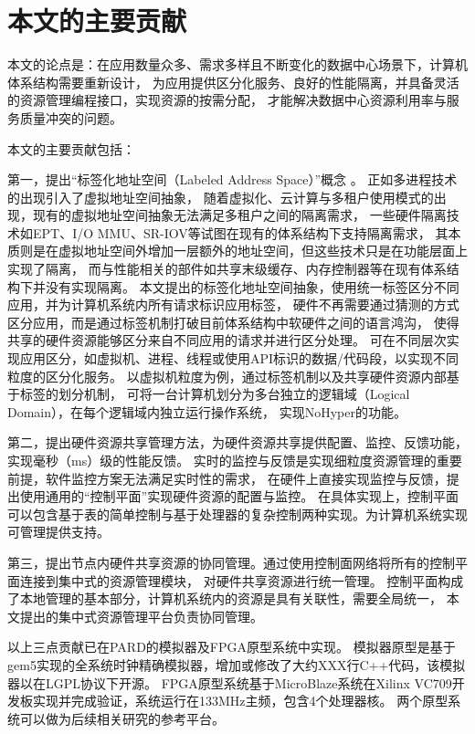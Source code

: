 \section{本文的主要贡献}

本文的论点是：在应用数量众多、需求多样且不断变化的数据中心场景下，计算机体系结构需要重新设计，
为应用提供区分化服务、良好的性能隔离，并具备灵活的资源管理编程接口，实现资源的按需分配，
才能解决数据中心资源利用率与服务质量冲突的问题。

本文的主要贡献包括：

第一，提出``标签化地址空间（Labeled Address Space）''概念 。
正如多进程技术的出现引入了虚拟地址空间抽象，
随着虚拟化、云计算与多租户使用模式的出现，现有的虚拟地址空间抽象无法满足多租户之间的隔离需求，
一些硬件隔离技术如EPT、I/O MMU、SR-IOV等试图在现有的体系结构下支持隔离需求，
其本质则是在虚拟地址空间外增加一层额外的地址空间，但这些技术只是在功能层面上实现了隔离，
而与性能相关的部件如共享末级缓存、内存控制器等在现有体系结构下并没有实现隔离。
本文提出的标签化地址空间抽象，使用统一标签区分不同应用，并为计算机系统内所有请求标识应用标签，
硬件不再需要通过猜测的方式区分应用，而是通过标签机制打破目前体系结构中软硬件之间的语言鸿沟，
使得共享的硬件资源能够区分来自不同应用的请求并进行区分处理。
可在不同层次实现应用区分，如虚拟机、进程、线程或使用API标识的数据/代码段，以实现不同粒度的区分化服务。
以虚拟机粒度为例，通过标签机制以及共享硬件资源内部基于标签的划分机制，
可将一台计算机划分为多台独立的逻辑域（Logical Domain），在每个逻辑域内独立运行操作系统，
实现NoHyper\cite{keller_nohype:_2010}的功能。

第二，提出硬件资源共享管理方法，为硬件资源共享提供配置、监控、反馈功能，实现毫秒（ms）级的性能反馈。
实时的监控与反馈是实现细粒度资源管理的重要前提，软件监控方案无法满足实时性的需求，
在硬件上直接实现监控与反馈，提出使用通用的``控制平面''实现硬件资源的配置与监控。
在具体实现上，控制平面可以包含基于表的简单控制与基于处理器的复杂控制两种实现。为计算机系统实现可管理提供支持。


第三，提出节点内硬件共享资源的协同管理。通过使用控制面网络将所有的控制平面连接到集中式的资源管理模块，
对硬件共享资源进行统一管理。
控制平面构成了本地管理的基本部分，计算机系统内的资源是具有关联性，需要全局统一，
本文提出的集中式资源管理平台负责协同管理。

以上三点贡献已在PARD的模拟器及FPGA原型系统中实现。
模拟器原型是基于gem5实现的全系统时钟精确模拟器，增加或修改了大约XXX行C++代码，该模拟器以在LGPL协议下开源。
FPGA原型系统基于MicroBlaze系统在Xilinx VC709开发板实现并完成验证，系统运行在133MHz主频，包含4个处理器核。
两个原型系统可以做为后续相关研究的参考平台。


